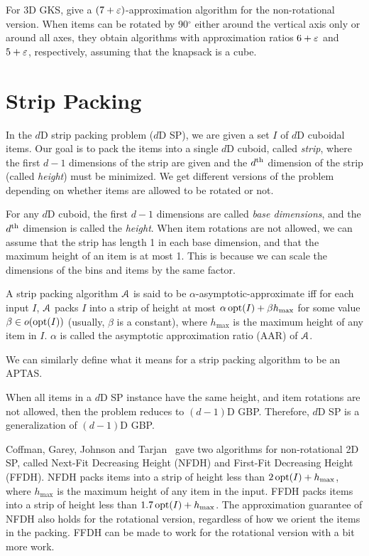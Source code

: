 For 3D GKS, \cite{diedrich2008approximation} give a $(7+\varepsilon)$-approximation
algorithm for the non-rotational version.
When items can be rotated by 90$^{\circ}$ either around the vertical axis only
or around all axes, they obtain algorithms with approximation ratios
$6 + \varepsilon$ and $5 + \varepsilon$, respectively, assuming that the knapsack is a cube.

\section{Strip Packing}

In the $d$D strip packing problem ($d$D SP),
we are given a set $I$ of $d$D cuboidal items.
Our goal is to pack the items into a single $d$D cuboid, called \emph{strip},
where the first $d-1$ dimensions of the strip are given
and the $d^{\textrm{th}}$ dimension of the strip (called \emph{height}) must be minimized.
We get different versions of the problem depending on whether
items are allowed to be rotated or not.

For any $d$D cuboid, the first $d-1$ dimensions are called \emph{base dimensions},
and the $d^{\textrm{th}}$ dimension is called the \emph{height}.
When item rotations are not allowed, we can assume \wLoG{} that
the strip has length 1 in each base dimension, and that the
maximum height of an item is at most 1.
This is because we can scale the dimensions of the bins and items by the same factor.

\begin{definition}
A strip packing algorithm $\mathcal{A}$ is said to be
$\alpha$-asymptotic-approximate iff for each input $I$,
$\mathcal{A}$ packs $I$ into a strip of height at most
$\alpha\operatorname{opt}(I) + \beta h_{\max}$
for some value $\beta \in o(\operatorname{opt}(I))$ (usually, $\beta$ is a constant),
where $h_{\max}$ is the maximum height of any item in $I$.
$\alpha$ is called the asymptotic approximation ratio (AAR) of $\mathcal{A}$.
\end{definition}
We can similarly define what it means for a strip packing algorithm to be an APTAS.

When all items in a $d$D SP instance have the same height,
and item rotations are not allowed, then the problem reduces to $(d-1)$D GBP.
Therefore, $d$D SP is a generalization of $(d-1)$D GBP.

Coffman, Garey, Johnson and Tarjan~\cite{coffman1980performance}
gave two algorithms for non-rotational 2D SP,
called Next-Fit Decreasing Height (NFDH) and First-Fit Decreasing Height (FFDH).
NFDH packs items into a strip of height less than $2\operatorname{opt}(I) + h_{\max}$,
where $h_{\max}$ is the maximum height of any item in the input.
FFDH packs items into a strip of height less than $1.7\operatorname{opt}(I) + h_{\max}$.
The approximation guarantee of NFDH also holds for the rotational version,
regardless of how we orient the items in the packing.
FFDH can be made to work for the rotational version with a bit more work.

